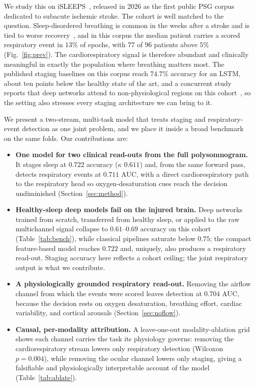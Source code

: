 \documentclass[preprint,12pt]{elsarticle}
\newcommand{\mmAcc}{0.722}
\newcommand{\mmK}{0.611}
\newcommand{\mmAuc}{0.711}
\newcommand{\noflowAuc}{0.704}
\begin{document}
We study this on iSLEEPS~\cite{maiti2026isleeps}, released in 2026 as the first public PSG
corpus dedicated to subacute ischemic stroke. The cohort is well matched to the question.
Sleep-disordered breathing is common in the weeks after a stroke and is tied to worse
recovery~\cite{bassetti2006sleep,denis2024sleep}, and in this corpus the median patient
carries a scored respiratory event in $13\%$ of epochs, with $77$ of $96$ patients above
$5\%$ (Fig.~\ref{fig:prev}). The cardiorespiratory signal is therefore abundant and
clinically meaningful in exactly the population where breathing matters most. The published
staging baselines on this corpus reach $74.7\%$ accuracy for an LSTM, about ten points below
the healthy state of the art, and a concurrent study reports that deep networks attend to
non-physiological regions on this cohort~\cite{bose2026gap}, so the setting also stresses
every staging architecture we can bring to it.

We present a two-stream, multi-task model that treats staging and respiratory-event
detection as one joint problem, and we place it inside a broad benchmark on the same folds. Our
contributions are:

\begin{itemize}
\item[\textbf{C1.}] \textbf{One model for two clinical read-outs from the full polysomnogram.} It stages
sleep at $\mmAcc$ accuracy ($\kappa$ $\mmK$) and, from the same forward pass, detects
respiratory events at $\mmAuc$ AUC, with a direct cardiorespiratory path to the respiratory
head so oxygen-desaturation cues reach the decision undiminished (Section~\ref{sec:method}).
\item[\textbf{C2.}] \textbf{Healthy-sleep deep models fail on the injured brain.} Deep networks trained from
scratch, transferred from healthy sleep, or applied to the raw multichannel signal collapse to
$0.61$--$0.69$ accuracy on this cohort (Table~\ref{tab:bench}), while classical pipelines
saturate below $0.75$; the compact feature-based model reaches $\mmAcc$ and, uniquely, also
produces a respiratory read-out. Staging accuracy here reflects a cohort ceiling; the joint respiratory output is what we contribute.
\item[\textbf{C3.}] \textbf{A physiologically grounded respiratory read-out.}
Removing the airflow channel from which the events were scored leaves detection at
$\noflowAuc$ AUC, because the decision rests on oxygen desaturation, breathing effort,
cardiac variability, and cortical arousals (Section~\ref{sec:noflow}).
\item[\textbf{C4.}] \textbf{Causal, per-modality attribution.} A
leave-one-out modality-ablation grid shows each channel carries the task its physiology governs:
removing the cardiorespiratory stream lowers only respiratory detection (Wilcoxon $p=0.004$),
while removing the ocular channel lowers only staging, giving a falsifiable and physiologically
interpretable account of the model (Table~\ref{tab:ablate}).
\end{itemize}
\end{document}
